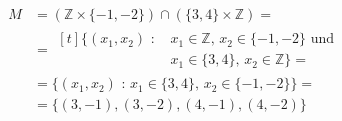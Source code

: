 \begin{enumerate}[(a)]
        \begin{align*}
            M &= (\mathbb{Z} \times \{-1, -2\}) \cap (\{3, 4\} \times \mathbb{Z}) =\\[5pt]
              &=
              \begin{aligned}[t]
                  \{(x_1, x_2) \text{ : }& x_1 \in \mathbb{Z} \text{, } x_2 \in \{-1, -2\} \text{ und}\\
                                         & x_1 \in \{3, 4\} \text{, } x_2 \in \mathbb{Z}\} =
              \end{aligned}\\
              &= \{(x_1, x_2) \text{ : } x_1 \in \{3, 4\} \text{, } x_2 \in \{-1, -2\}\} =\\[5pt]
              &= \{(3, -1), (3, -2), (4, -1), (4, -2)\}
        \end{align*}
\end{enumerate}

